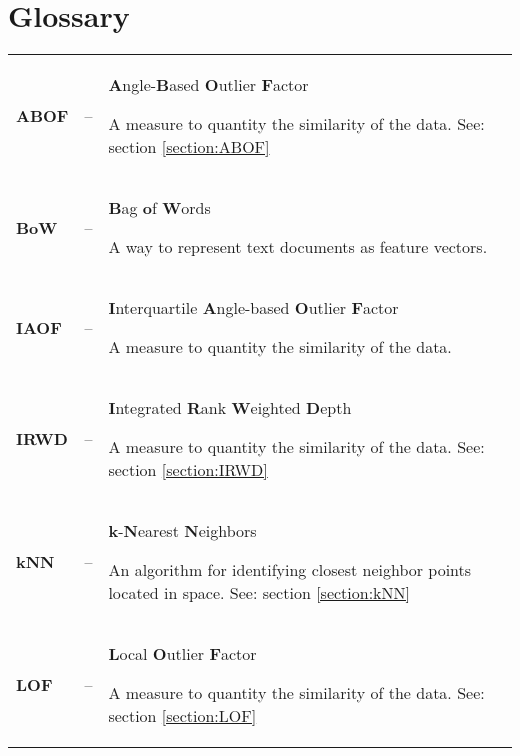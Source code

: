 \chapter{Glossary}
\label{chapter:glossary}

{%
    \noindent
    \renewcommand{\arraystretch}{1.5}
    \begin{longtable}{>{\bfseries}l l p{}}
        ABOF
        &–&
        \textbf{A}ngle-\textbf{B}ased \textbf{O}utlier \textbf{F}actor
        \par
        \small
        A measure to quantity the similarity of the data.
        \newline
        See: section \ref{section:ABOF}
        \\

        BoW
        &–&
        \textbf{B}ag \textbf{o}f \textbf{W}ords
        \par
        \small
        A way to represent text documents as feature vectors.
        \\

        IAOF
        &–&
        \textbf{I}nterquartile \textbf{A}ngle-based \textbf{O}utlier \textbf{F}actor
        \par
        \small
        A measure to quantity the similarity of the data.
        \\

        IRWD
        &–&
        \textbf{I}ntegrated \textbf{R}ank \textbf{W}eighted \textbf{D}epth
        \par
        \small
        A measure to quantity the similarity of the data.
        \newline
        See: section \ref{section:IRWD}
        \\

        kNN
        &–&
        \textbf{k}-\textbf{N}earest \textbf{N}eighbors
        \par
        \small
        An algorithm for identifying closest neighbor points located in space.
        \newline
        See: section \ref{section:kNN}
        \\

        LOF
        &–&
        \textbf{L}ocal \textbf{O}utlier \textbf{F}actor
        \par
        \small
        A measure to quantity the similarity of the data.
        \newline
        See: section \ref{section:LOF}
        \\


\end{longtable}}
